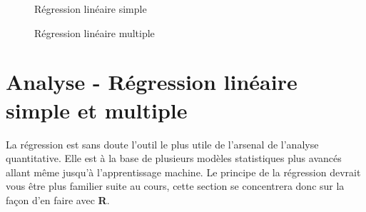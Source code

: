 \documentclass[10.5pt,a4paper]{article}
\begin{document}
   \begin{figure}[H]
    \centering
    \caption{Régression linéaire simple}
    \label{anaReg1}
    \end{figure}
    
      \begin{figure}[H]
    \centering
    \caption{Régression linéaire multiple}
    \label{anaReg2}
    \end{figure}

  
  \section{Analyse - Régression linéaire simple et multiple}
  La régression est sans doute l'outil le plus utile de l'arsenal de l'analyse quantitative. Elle est à la base de plusieurs modèles statistiques plus avancés allant même jusqu'à l'apprentissage machine. Le principe de la régression devrait vous être plus familier suite au cours, cette section se concentrera donc sur la façon d'en faire avec \textbf{R}.
\end{document}

